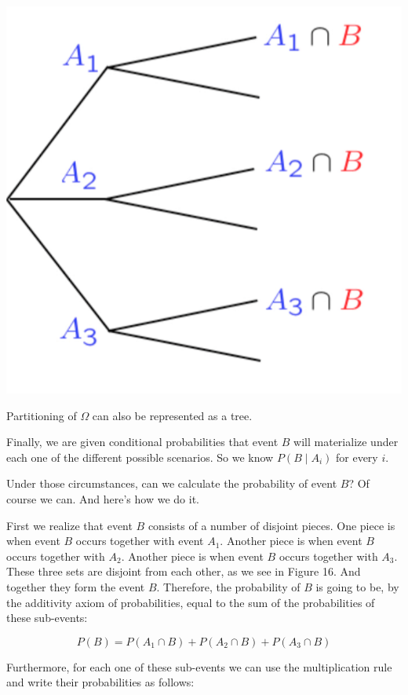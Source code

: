 \documentclass{tufte-handout}
\begin{document}
\begin{marginfigure}
  \includegraphics[scale = 0.3]{TotalProbAsTree}
  \caption{Partitioning of $\Omega$ can also be represented as a tree.}
\end{marginfigure}


\vspace{0.2cm}
Finally, we are given conditional probabilities that event $B$ will materialize under each one of the
different possible scenarios. So we know $P(B \mid A_i)$ for every $i$.


Under those circumstances, can we calculate the probability of event $B$? Of
course we can. And here's how we do it.


First we realize that event $B$ consists of a number of disjoint pieces. One piece is when event $B$ occurs
together with event $A_1$. Another piece is when event $B$ occurs together with $A_2$. Another piece is when
event $B$ occurs together with $A_3$. These three sets are disjoint from each other, as we see in Figure 16. 
And together they form the event $B$. Therefore, the probability of $B$ is going to be, by the
additivity axiom of probabilities, equal to the sum of the probabilities of these sub-events:

$$
P(B) = P(A_1 \cap B) + P(A_2 \cap B) + P(A_3 \cap B)
$$


Furthermore, for each one of these sub-events we can use the multiplication rule and write their
probabilities as follows:
\end{document}
